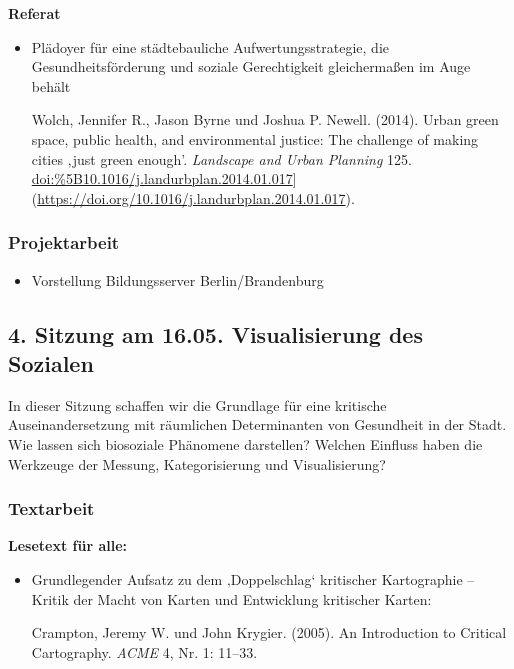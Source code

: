 \documentclass[
  ngerman,
]{article}
\providecommand{\tightlist}{%
  \setlength{\itemsep}{0pt}\setlength{\parskip}{0pt}}
\begin{document}
\textbf{Referat}

\begin{itemize}
\item
  Plädoyer für eine städtebauliche Aufwertungsstrategie, die Gesundheitsförderung und soziale Gerechtigkeit gleichermaßen im Auge behält

  Wolch, Jennifer R., Jason Byrne und Joshua P. Newell. (2014). Urban green space, public health, and environmental justice: The challenge of making cities ‚just green enough'. \emph{Landscape and Urban Planning} 125. \url{doi:\%5B10.1016/j.landurbplan.2014.01.017}{]}(\url{https://doi.org/10.1016/j.landurbplan.2014.01.017}).
\end{itemize}

\hypertarget{projektarbeit-1}{%
\subsubsection*{Projektarbeit}\label{projektarbeit-1}}

\begin{itemize}
\tightlist
\item
  Vorstellung Bildungsserver Berlin/Brandenburg
\end{itemize}

\hypertarget{sitzung-am-16.05.-visualisierung-des-sozialen}{%
\subsection*{4. Sitzung am 16.05. \textbar{} Visualisierung des Sozialen}\label{sitzung-am-16.05.-visualisierung-des-sozialen}}

In dieser Sitzung schaffen wir die Grundlage für eine kritische Auseinandersetzung mit räumlichen Determinanten von Gesundheit in der Stadt. Wie lassen sich biosoziale Phänomene darstellen? Welchen Einfluss haben die Werkzeuge der Messung, Kategorisierung und Visualisierung?

\hypertarget{textarbeit-3}{%
\subsubsection*{Textarbeit}\label{textarbeit-3}}

\textbf{Lesetext für alle:}

\begin{itemize}
\item
  Grundlegender Aufsatz zu dem ‚Doppelschlag` kritischer Kartographie -- Kritik der Macht von Karten und Entwicklung kritischer Karten:

  Crampton, Jeremy W. und John Krygier. (2005). An Introduction to Critical Cartography. \emph{ACME} 4, Nr. 1: 11--33.
\end{itemize}
\end{document}
